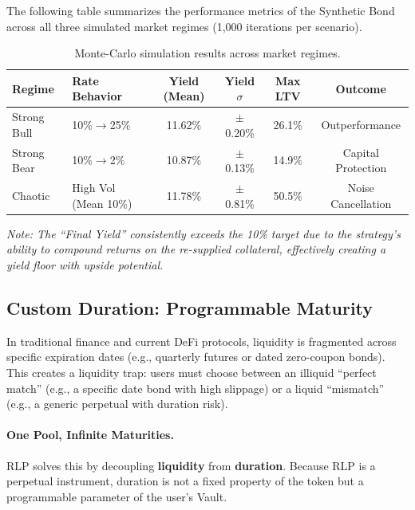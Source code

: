 \documentclass[12pt]{article}
\begin{document}
The following table summarizes the performance metrics of the Synthetic Bond across all three simulated market regimes (1,000 iterations per scenario).

\begin{table}[H]
\centering
\caption{Monte-Carlo simulation results across market regimes.}
\small
\begin{tabular}{@{}llcccc@{}}
\toprule
\textbf{Regime} & \textbf{Rate Behavior} & \textbf{Yield (Mean)} & \textbf{Yield $\sigma$} & \textbf{Max LTV} & \textbf{Outcome} \\
\midrule
Strong Bull & 10\%$\rightarrow$25\% & 11.62\% & $\pm$0.20\% & 26.1\% & Outperformance \\
Strong Bear & 10\%$\rightarrow$2\%  & 10.87\% & $\pm$0.13\% & 14.9\% & Capital Protection \\
Chaotic     & High Vol (Mean 10\%)  & 11.78\% & $\pm$0.81\% & 50.5\% & Noise Cancellation \\
\bottomrule
\end{tabular}
\end{table}

\emph{Note: The ``Final Yield'' consistently exceeds the 10\% target due to the strategy's ability to compound returns on the re-supplied collateral, effectively creating a yield floor with upside potential.}

\subsection{Custom Duration: Programmable Maturity}

In traditional finance and current DeFi protocols, liquidity is fragmented across specific expiration dates (e.g., quarterly futures or dated zero-coupon bonds). This creates a liquidity trap: users must choose between an illiquid ``perfect match'' (e.g., a specific date bond with high slippage) or a liquid ``mismatch'' (e.g., a generic perpetual with duration risk).

\paragraph{One Pool, Infinite Maturities.}
RLP solves this by decoupling \textbf{liquidity} from \textbf{duration}. Because RLP is a perpetual instrument, duration is not a fixed property of the token but a programmable parameter of the user's Vault.
\end{document}
